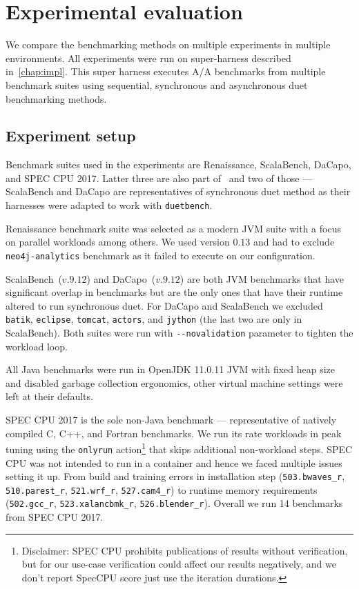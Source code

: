 \chapter{Experimental evaluation}
\label{chap:evaluation}

We compare the benchmarking methods on multiple experiments in multiple environments.
All experiments were run on super-harness described in~\cref{chap:impl}.
This super harness executes A/A benchmarks from multiple benchmark suites using sequential, synchronous and asynchronous duet benchmarking methods.

\section{Experiment setup}
\label{sec:experiment_setup}

Benchmark suites used in the experiments are Renaissance, ScalaBench, DaCapo, and SPEC CPU 2017.
Latter three are also part of~\citet{bulej2020duet} and two of those --- ScalaBench and DaCapo are representatives of synchronous duet method as their harnesses were adapted to work with \lstinline{duetbench}.

Renaissance benchmark suite was selected as a modern JVM suite with a focus on parallel workloads among others\cite{prokopec2019renaissance}.
We used version $0.13$ and had to exclude \lstinline{neo4j-analytics} benchmark as it failed to execute on our configuration.

ScalaBench~($v.9.12$) and DaCapo~($v.9.12$) are both JVM benchmarks that have significant overlap in benchmarks but are the only ones that have their runtime altered to run synchronous duet.
For DaCapo and ScalaBench we excluded \lstinline{batik}, \lstinline{eclipse}, \lstinline{tomcat}, \lstinline{actors}, and \lstinline{jython} (the last two are only in ScalaBench).
Both suites were run with \lstinline{--novalidation} parameter to tighten the workload loop.

All Java benchmarks were run in OpenJDK 11.0.11 JVM with fixed heap size and disabled garbage collection ergonomics, other virtual machine settings were left at their defaults.

SPEC CPU 2017 is the sole non-Java benchmark --- representative of natively compiled C, C++, and Fortran benchmarks.
We run its rate workloads in peak tuning using the \lstinline{onlyrun} action\footnote{Disclaimer: SPEC CPU prohibits publications of results without verification, but for our use-case verification could affect our results negatively, and we don't report SpecCPU score just use the iteration durations.} that skips additional non-workload steps.
SPEC CPU was not intended to run in a container and hence we faced multiple issues setting it up.
From build and training errors in installation step (\lstinline{503.bwaves_r}, \lstinline{510.parest_r}, \lstinline{521.wrf_r}, \lstinline{527.cam4_r}) to runtime memory requirements (\lstinline{502.gcc_r}, \lstinline{523.xalancbmk_r}, \lstinline{526.blender_r}).
Overall we run 14 benchmarks from SPEC CPU 2017.

